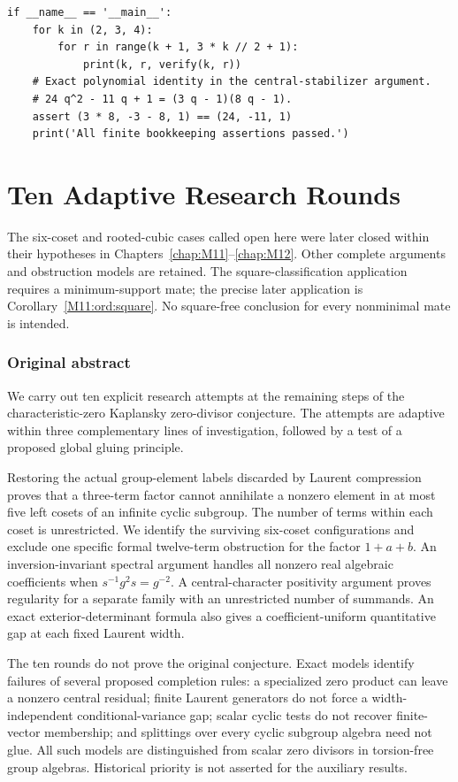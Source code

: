 \documentclass[11pt,a4paper,oneside]{report}
\theoremstyle{definition}
\theoremstyle{remark}
\newcommand{\compilationnote}[1]{\medskip\noindent{\small\color{accent}\textbf{Compilation note --- 23 November 2026.}}\par
{\small #1}\par\medskip}
\begin{document}
\begin{lstlisting}
if __name__ == '__main__':
    for k in (2, 3, 4):
        for r in range(k + 1, 3 * k // 2 + 1):
            print(k, r, verify(k, r))
    # Exact polynomial identity in the central-stabilizer argument.
    # 24 q^2 - 11 q + 1 = (3 q - 1)(8 q - 1).
    assert (3 * 8, -3 - 8, 1) == (24, -11, 1)
    print('All finite bookkeeping assertions passed.')
\end{lstlisting}



\chapter{Ten Adaptive Research Rounds}\label{chap:M10}
\par
\compilationnote{The six-coset and rooted-cubic cases called open here were later
closed within their hypotheses in Chapters~\ref{chap:M11}--\ref{chap:M12}.
Other complete arguments and obstruction models are retained.
The square-classification application requires a minimum-support mate;
the precise later application is Corollary~\ref{M11:ord:square}.
No square-free conclusion for every nonminimal mate is intended.}
\subsection*{Original abstract}
We carry out ten explicit research attempts at the remaining steps of
the characteristic-zero Kaplansky zero-divisor conjecture. The attempts
are adaptive within three complementary lines of investigation,
followed by a test of a proposed global gluing principle.

Restoring the actual group-element labels discarded by Laurent
compression proves that a three-term factor cannot annihilate a
nonzero element in at most five left cosets of an infinite cyclic
subgroup. The number of terms within each coset is unrestricted.
We identify the surviving six-coset configurations and exclude one
specific formal twelve-term obstruction for the factor $1+a+b$.
An inversion-invariant spectral argument handles all nonzero real
algebraic coefficients when $s^{-1}g^2s=g^{-2}$. A central-character
positivity argument proves regularity for a separate family with an
unrestricted number of summands. An exact exterior-determinant formula
also gives a coefficient-uniform quantitative gap at each fixed
Laurent width.

The ten rounds do not prove the original conjecture. Exact models
identify failures of several proposed completion rules: a specialized
zero product can leave a nonzero central residual; finite Laurent
generators do not force a width-independent conditional-variance
gap; scalar cyclic tests do not recover finite-vector membership;
and splittings over every cyclic subgroup algebra need not glue.
All such models are distinguished from scalar zero divisors in
torsion-free group algebras. Historical priority is not asserted
for the auxiliary results.
\medskip
\end{document}
